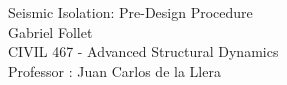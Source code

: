 \documentclass{article}
\begin{document}
\newpage
\pagestyle{fancy}
\fancyhf{}
\setcounter{page}{1} 
\fancyfoot[R]{\thepage}

\maketitle
\newpage
\begin{center}
\Large{Seismic Isolation: Pre-Design Procedure}\\
\vspace{0.3cm}
\large{Gabriel Follet}\\
\vspace{0.5cm}
\large {CIVIL 467 - Advanced Structural Dynamics \\
\vspace{0.2cm}
    Professor : Juan Carlos de la Llera}\\
\end{center}
\end{document}
